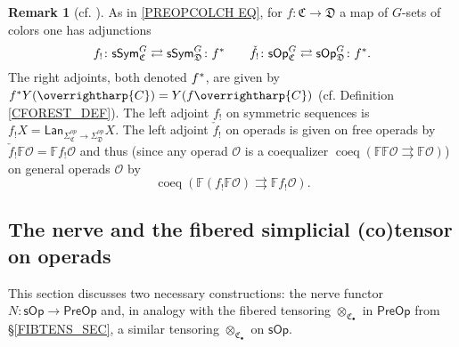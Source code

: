 \documentclass[a4paper,10pt
,draft
]{article}%
\numberwithin{equation}{section}
\numberwithin{figure}{section}
\theoremstyle{definition} %
\newtheorem{remark}[equation]{Remark}%
\newcommand{\vect}[1]{\text{\overrightharp{\ensuremath{#1}}}}
\renewcommand{\O}{\ensuremath{\mathcal O}}
\newcommand{\1}{\ensuremath{\mathbbm 1}}%
\begin{document}
\begin{remark}[{cf. \cite[Rem. \ref{OC-OP_MAP REM}]{BP_FCOP}}]
	\label{CHECKF REM}
As in \eqref{PREOPCOLCH EQ},
for $f \colon \mathfrak{C} \to \mathfrak{D}$
a map of $G$-sets of colors one has adjunctions
\begin{equation}
f_{!} \colon
\mathsf{sSym}^{G}_{\mathfrak{C}}
\rightleftarrows
\mathsf{sSym}^{G}_{\mathfrak{D}}
\colon f^{\**}
\qquad
\check{f}_{!} \colon
\mathsf{sOp}^{G}_{\mathfrak{C}}
\rightleftarrows
\mathsf{sOp}^{G}_{\mathfrak{D}}
\colon f^{\**}.
\end{equation}
The right adjoints, 
both denoted $f^{\**}$, are given by 
$f^{\**}Y(\vect{C}) = Y(f\vect{C})$
(cf. Definition \ref{CFOREST_DEF}).
The left adjoint $f_!$ on symmetric sequences is
$f_!X = 
\mathsf{Lan}_{\Sigma^{op}_{\mathfrak{C}}\to \Sigma^{op}_{\mathfrak{D}}} X$.
The left adjoint  $\check{f}_!$ on operads
is given on free operads by 
$\check{f}_! \mathbb{F} \O = \mathbb{F} f_! \O$
and thus
(since any operad $\O$ is a coequalizer
$\mathop{\mathrm{coeq}}
\left(
\mathbb{F}\mathbb{F} \O 
\rightrightarrows
\mathbb{F} \O
\right)$)
on general operads $\O$ by
\begin{equation}\label{CHECKF EQ}
\mathop{\mathrm{coeq}}
\left(
\mathbb{F}\left(f_! \mathbb{F} \O \right)
\rightrightarrows
\mathbb{F} f_! \O
\right).
\end{equation}
\end{remark}



\subsection{The nerve and the fibered simplicial (co)tensor on operads}\label{NERTENSCOOP SEC}

This section discusses two necessary constructions: 
the nerve functor
$
N \colon \mathsf{sOp} \to
\mathsf{PreOp}$
and, in analogy with
the fibered tensoring
$\otimes_{\mathfrak{C}_{\bullet}}$ in 
$\mathsf{PreOp}$ from
\S \ref{FIBTENS_SEC},
a similar tensoring
$\otimes_{\mathfrak{C}_{\bullet}}$
on $\mathsf{sOp}$.
\end{document}
